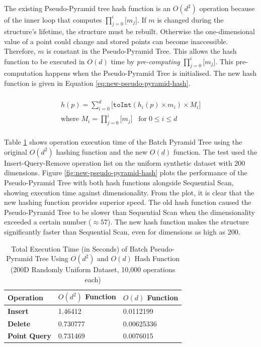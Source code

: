 The existing Pseudo-Pyramid tree hash function is an $O(d^2)$ operation because of the inner loop that computes $\prod_{j=0}^{i}{\lbrack m_j \rbrack}$. If $m$ is changed during the structure's lifetime, the structure must be rebuilt. Otherwise the one-dimensional value of a point could change and stored points can become inaccessible. Therefore, $m$ is constant in the Pseudo-Pyramid Tree. This allows the hash function to be executed in $O(d)$ time by \textit{pre-computing} $\prod_{j=0}^{i}{\lbrack m_j \rbrack}$. This pre-computation happens when the Pseudo-Pyramid Tree is initialised. The new hash function is given in Equation \ref{eq:new-pseudo-pyramid-hash}.

\begin{multline}\\
	h(p) = \sum_{i = 0}^{d} { \lbrack \texttt{toInt}( h_i(p) \times m_i ) \times M_i \rbrack } \\
	\text{where } M_i = \prod_{j=0}^{i}{\lbrack m_j \rbrack} \;\;\; \text{for} \; 0 \leq i \leq d \\
	\label{eq:new-pseudo-pyramid-hash}
\end{multline}

Table \ref{tab:new-pseudo-pyramid-hash} shows operation execution time of the Batch Pyramid Tree using the original $O(d^2)$ hashing function and the new $O(d)$ function. The test used the Insert-Query-Remove operation list on the uniform synthetic dataset with 200 dimensions. Figure \ref{fig:new-pseudo-pyramid-hash} plots the performance of the Pseudo-Pyramid Tree with both hash functions alongside Sequential Scan, showing execution time against dimensionality. From the plot, it is clear that the new hashing function provides superior speed. The old hash function caused the Pseudo-Pyramid Tree to be slower than Sequential Scan when the dimensionality exceeded a certain number ($\approx 57$). The new hash function makes the structure significantly faster than Sequential Scan, even for dimensions as high as 200.

\begin{table}
	\centering
	\begin{tabular}{|l|l|l|}
		\hline
		\textbf{Operation} & \textbf{$O(d^2)$ Function} & \textbf{$O(d)$ Function} \\
		\hline
		\textbf{Insert} & 1.46412 & 0.0112199 \\
		\textbf{Delete} & 0.730777 & 0.00625336 \\
		\textbf{Point Query} & 0.731469 & 0.0076015 \\
		\hline
	\end{tabular}
	\caption{Total Execution Time (in Seconds) of Batch Pseudo-Pyramid Tree Using $O(d^2)$ and $O(d)$ Hash Function (200D Randomly Uniform Dataset, 10,000 operations each)}
	\label{tab:new-pseudo-pyramid-hash}
\end{table}


